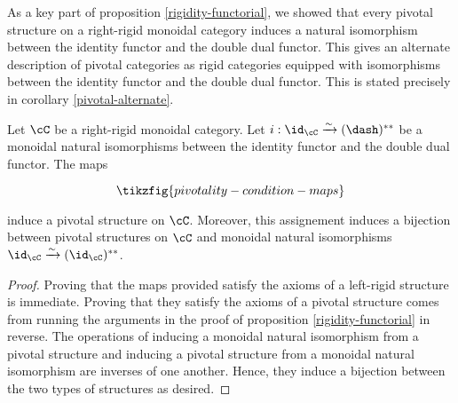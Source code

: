 \begin{rem}
As a key part of proposition \ref{rigidity-functorial}, we showed that every pivotal structure on a right-rigid monoidal category induces a natural isomorphism between the identity functor and the double dual functor. This gives an alternate description of pivotal categories as rigid categories equipped with isomorphisms between the identity functor and the double dual functor. This is stated precisely in corollary \ref{pivotal-alternate}.
\end{rem}

\begin{cor}\label{pivotal-alternate} Let $\cC$ be a right-rigid monoidal category. Let $i:\id_{\cC}\xrightarrow{\sim}(\dash)^{**}$ be a monoidal natural isomorphisms between the identity functor and the double dual functor. The maps

\begin{equation*}
\tikzfig{pivotality-condition-maps}
\end{equation*}

induce a pivotal structure on $\cC$. Moreover, this assignement induces a bijection between pivotal structures on $\cC$ and monoidal natural isomorphisms $\id_{\cC}\xrightarrow{\sim}(\id_{\cC})^{**}$.
\end{cor}
\begin{proof} Proving that the maps provided satisfy the axioms of a left-rigid structure is immediate. Proving that they satisfy the axioms of a pivotal structure comes from running the arguments in the proof of proposition \ref{rigidity-functorial} in reverse. The operations of inducing a monoidal natural isomorphism from a pivotal structure and inducing a pivotal structure from a monoidal natural isomorphism are inverses of one another. Hence, they induce a bijection between the two types of structures as desired.
\end{proof}

